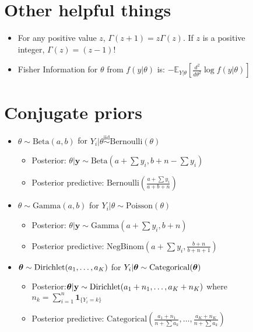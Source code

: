 \documentclass[12pt,a4paper,twocolumn]{article}
\newcommand{\btheta}{ \mbox{\boldmath $ \theta $} }
\newcommand{\bone}{\textbf{1}}
\newcommand{\by}{\textbf{y}}
\newcommand{\iidsim}{\overset{\text{iid}}{\sim} }
\begin{document}
\clearpage
{}
\begin{sidewaysfigure}
\section*{Other helpful things}
\begin{itemize}
	\item For any positive value $z$, $\Gamma(z+1) = z \Gamma(z)$. If $z$ is a positive integer, $\Gamma(z) = (z-1)!$
	\item Fisher Information for $\theta$ from $f(y | \theta)$ is: $-\mathbb{E}_{Y | \theta}\left[ \frac{d^2}{d\theta^2} \log f(y | \theta) \right]$
\end{itemize}


\section*{Conjugate priors}
\begin{itemize}
	\item $\theta \sim \text{Beta}(a,b)$ for $Y_{i} | \theta \iidsim \text{Bernoulli}(\theta)$ 
	\begin{itemize} 
		\item Posterior: $\theta | \by \sim \text{Beta}(a + \sum y_{i}, b + n - \sum y_{i})$
		\item Posterior predictive: $\text{Bernoulli}\left(\frac{a + \sum y_{i}}{a+b+n} \right)$
	\end{itemize}
	\item $\theta \sim \text{Gamma}(a, b)$ for $Y_{i} | \theta \sim \text{Poisson}(\theta)$ 
	\begin{itemize}
		\item Posterior: $\theta | \by \sim \text{Gamma}(a + \sum y_{i}, b + n)$
		\item Posterior predictive: $\text{NegBinom}\left(a + \sum y_{i}, \frac{b+n}{b+n+1} \right)$
	\end{itemize}
	\item $\btheta \sim \text{Dirichlet}(a_{1},\ldots, a_{K})$ for $Y_{i} | \btheta \sim \text{Categorical}(\btheta)$ 
		\begin{itemize}
		\item Posterior:$\btheta | \by \sim \text{Dirichlet}(a_{1} + n_{1}, \ldots, a_{K} + n_{K})$ where $n_{k} = \sum_{i=1}^{n} \bone_{\{Y_{i} = k\}}$
		\item Posterior predictive: $\text{Categorical}\left(\frac{a_{1} + n_{1}}{n + \sum a_{k}}, \ldots, \frac{a_{K} + n_{K}}{n + \sum a_{k}} \right)$
	\end{itemize}
	


\end{itemize}
\end{sidewaysfigure}
\end{document}
